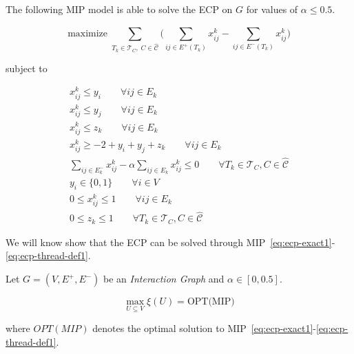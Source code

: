The following \acrshort{MIP} model is able to solve the \acrshort{ECP} on $G$
for values of $\alpha \leq 0.5$.

\begin{equation}
	\label{eq:ecp-exact1}
	\text{maximize} \; \sum_{ T_{k} \in \mathcal{T}_{C}, \; C \in
		\mathcal{\hat{C}} } \big( \sum^{}_{ij \in E^{+} (T_{k})} x_{ij}
		^{k} - \sum_{ij \in E^{-} (T_{k})} x_{ij} ^{k} \big)
\end{equation} \begin{center} subject to \end{center}
\begin{gather}
	\label{eq:ecp-v1}
	x _{ij}^{k}  \leq y_i \quad\quad \forall ij \in E_k  \\
	\label{eq:ecp-v2}
	x _{ij}^{k}  \leq y_j \quad\quad \forall ij \in E_k \\
	\label{eq:ecp-t1}
	x _{ij}^{k}  \leq z_k \quad\quad \forall ij \in E_k \\
	\label{eq:ecp-e1}
	x _{ij} ^{k} \geq - 2 + y_i + y_j + z_k \quad\quad \forall ij \in E_k \\
	\label{eq:ecp-alpha-constraint1}
	\sum^{}_{ij \in E_k^{-} } x_{ij}^{k}  - \alpha \sum^{}_{ij \in E_k}
	x_{ij} ^{k}  \leq 0 \quad\quad \forall T_{k} \in \mathcal{T} _{C}, C \in
	\hat{\mathcal{C}} \\
	\label{eq:ecp-vertex-def1}
	y _{i} \in  \{0, 1\} \quad\quad \forall i \in V \\
	\label{eq:ecp-edge-def1}
	0 \leq x _{ij} ^{k}  \leq 1 \quad\quad \forall ij \in E_k \\
	\label{eq:ecp-thread-def1}
	0 \leq z _{k} \leq 1 \quad\quad \forall T_{k} \in \mathcal{T} _{C}, C \in
	\hat{\mathcal{C}}
\end{gather}

We will know show that the \acrshort{ECP} can be solved through
MIP~\ref{eq:ecp-exact1}-\ref{eq:ecp-thread-def1}.

\begin{theorem}
	\label{th:ecp-mip}
	Let $G = (V, E^{+}, E^{-})$ be an \emph{Interaction Graph} and $\alpha \in
		[0, 0.5]$.

	\begin{equation}
		\max_{U \subseteq V} \xi(U) = \text{OPT(MIP)}
	\end{equation}

	where $OPT(MIP)$ denotes the optimal solution to
	MIP~\ref{eq:ecp-exact1}-\ref{eq:ecp-thread-def1}.
\end{theorem}

